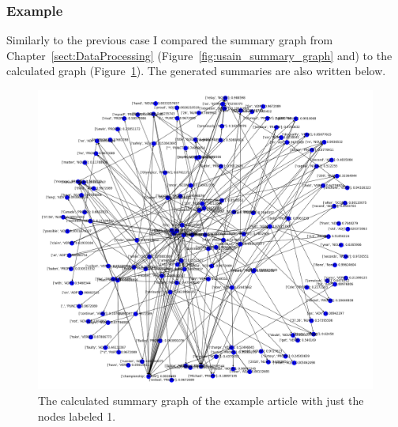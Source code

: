 \subsubsection{Example}
Similarly to the previous case I compared the summary graph from Chapter~\ref{sect:DataProcessing} (Figure~\ref{fig:usain_summary_graph} and) to the calculated graph (Figure~\ref{fig:usain_bolt_predicted1}). The generated summaries are also written below.

\begin{figure}[!ht]
	\centering
	\includegraphics[width=150mm, keepaspectratio]{figures/usain_bolt_predicted_attended.png}
	\caption{The calculated summary graph of the example article with just the nodes labeled 1.}
	\label{fig:usain_bolt_predicted1}
\end{figure}

